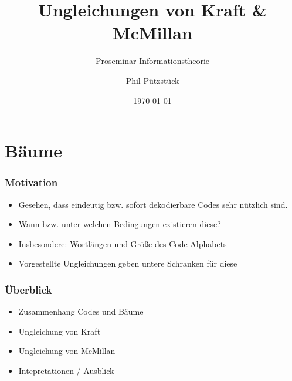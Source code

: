 \documentclass{beamer}
\title{Ungleichungen von Kraft \& McMillan}
\subtitle{Proseminar Informationstheorie}
\author{Phil Pützstück}
\date{\today}
\begin{document}
\maketitle

\section{Bäume}
\begin{frame}
    \frametitle{Motivation}
    \begin{itemize}
        \setlength\itemsep{2em}
        \item Gesehen, dass eindeutig bzw. sofort dekodierbare Codes sehr nützlich sind.
        \item Wann bzw. unter welchen Bedingungen existieren diese?
        \item Insbesondere: Wortlängen und Größe des Code-Alphabets
        \item Vorgestellte Ungleichungen geben untere Schranken für diese
    \end{itemize}
\end{frame}

\begin{frame}
    \frametitle{Überblick}
    \begin{itemize}
        \setlength\itemsep{2em}
        \item Zusammenhang Codes und Bäume
        \item Ungleichung von Kraft
        \item Ungleichung von McMillan
        \item Intepretationen / Ausblick
    \end{itemize}
\end{frame}
\end{document}
